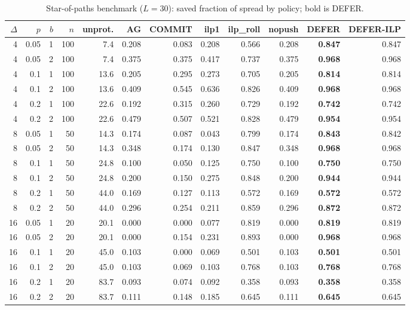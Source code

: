 \documentclass[ASNA,number]{USG}
\begin{document}
\begin{table}[h]
\centering
\caption{Star-of-paths benchmark ($L=30$): saved fraction of spread by policy; bold is DEFER.\label{tab:sop}}
\footnotesize
\begin{tabular}{rrrrrrrrrrrr}
\hline
$\Delta$ & $p$ & $b$ & $n$ & unprot. & AG & COMMIT & ilp1 & ilp\_roll & nopush & DEFER & DEFER-ILP \\
\hline
4 & 0.05 & 1 & 100 & 7.4 & 0.208 & 0.083 & 0.208 & 0.566 & 0.208 & \textbf{0.847} & 0.847 \\
4 & 0.05 & 2 & 100 & 7.4 & 0.375 & 0.375 & 0.417 & 0.737 & 0.375 & \textbf{0.968} & 0.968 \\
4 & 0.1 & 1 & 100 & 13.6 & 0.205 & 0.295 & 0.273 & 0.705 & 0.205 & \textbf{0.814} & 0.814 \\
4 & 0.1 & 2 & 100 & 13.6 & 0.409 & 0.545 & 0.636 & 0.826 & 0.409 & \textbf{0.968} & 0.968 \\
4 & 0.2 & 1 & 100 & 22.6 & 0.192 & 0.315 & 0.260 & 0.729 & 0.192 & \textbf{0.742} & 0.742 \\
4 & 0.2 & 2 & 100 & 22.6 & 0.479 & 0.507 & 0.521 & 0.828 & 0.479 & \textbf{0.954} & 0.954 \\
8 & 0.05 & 1 & 50 & 14.3 & 0.174 & 0.087 & 0.043 & 0.799 & 0.174 & \textbf{0.843} & 0.842 \\
8 & 0.05 & 2 & 50 & 14.3 & 0.348 & 0.174 & 0.130 & 0.847 & 0.348 & \textbf{0.968} & 0.968 \\
8 & 0.1 & 1 & 50 & 24.8 & 0.100 & 0.050 & 0.125 & 0.750 & 0.100 & \textbf{0.750} & 0.750 \\
8 & 0.1 & 2 & 50 & 24.8 & 0.200 & 0.150 & 0.275 & 0.848 & 0.200 & \textbf{0.944} & 0.944 \\
8 & 0.2 & 1 & 50 & 44.0 & 0.169 & 0.127 & 0.113 & 0.572 & 0.169 & \textbf{0.572} & 0.572 \\
8 & 0.2 & 2 & 50 & 44.0 & 0.296 & 0.254 & 0.211 & 0.859 & 0.296 & \textbf{0.872} & 0.872 \\
16 & 0.05 & 1 & 20 & 20.1 & 0.000 & 0.000 & 0.077 & 0.819 & 0.000 & \textbf{0.819} & 0.819 \\
16 & 0.05 & 2 & 20 & 20.1 & 0.000 & 0.154 & 0.231 & 0.893 & 0.000 & \textbf{0.968} & 0.968 \\
16 & 0.1 & 1 & 20 & 45.0 & 0.103 & 0.000 & 0.069 & 0.501 & 0.103 & \textbf{0.501} & 0.501 \\
16 & 0.1 & 2 & 20 & 45.0 & 0.103 & 0.069 & 0.103 & 0.768 & 0.103 & \textbf{0.768} & 0.768 \\
16 & 0.2 & 1 & 20 & 83.7 & 0.093 & 0.074 & 0.092 & 0.358 & 0.093 & \textbf{0.358} & 0.358 \\
16 & 0.2 & 2 & 20 & 83.7 & 0.111 & 0.148 & 0.185 & 0.645 & 0.111 & \textbf{0.645} & 0.645 \\
\hline
\end{tabular}
\end{table}
\end{document}
